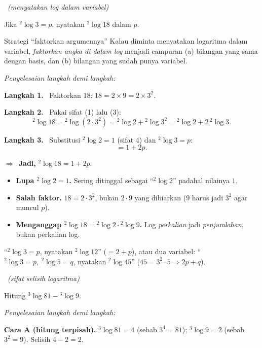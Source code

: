 \documentclass[11pt,a4paper]{report}
\theoremstyle{gaya}
\newcommand{\jawab}{\par\smallskip\noindent\textit{\textcolor{oranye}{Penyelesaian langkah demi langkah:}}\par\smallskip}
\newcommand{\langkah}[1]{\par\smallskip\noindent\textbf{\textcolor{biru}{Langkah #1.}}\ }
\newcommand{\jadi}{\par\smallskip\noindent$\Rightarrow$\ \textbf{Jadi, }}
\newcommand{\soalno}[2]{%
  \par\bigskip
  \noindent{\large\bfseries\color{ungu}\rule[-2pt]{4pt}{14pt}\ Soal #1}%
  \ {\normalfont\itshape\color{gray}(#2)}\par\nopagebreak\smallskip}
\begin{document}
\soalno{1.3.2}{menyatakan log dalam variabel}
\begin{soalbox}{}
Jika ${}^{2}\!\log 3 = p$, nyatakan ${}^{2}\!\log 18$ dalam $p$.
\end{soalbox}

\begin{ingat}{Strategi ``faktorkan argumennya''}
Kalau diminta menyatakan logaritma dalam variabel, \emph{faktorkan angka di
dalam log} menjadi campuran (a) bilangan yang sama dengan basis, dan (b) bilangan
yang sudah punya variabel.
\end{ingat}

\jawab
\langkah{1} Faktorkan $18$: $18 = 2\times 9 = 2\times 3^2$.
\langkah{2} Pakai sifat (1) lalu (3):
\[
{}^{2}\!\log 18 = {}^{2}\!\log(2\cdot3^2) = {}^{2}\!\log 2 + {}^{2}\!\log 3^2
= {}^{2}\!\log 2 + 2\,{}^{2}\!\log 3.
\]
\langkah{3} Substitusi ${}^{2}\!\log2=1$ (sifat 4) dan ${}^{2}\!\log3=p$:
\[
= 1 + 2p.
\]
\jadi ${}^{2}\!\log 18 = 1+2p$.

\begin{jebakan}
\begin{itemize}[leftmargin=*,topsep=2pt]
  \item \textbf{Lupa ${}^{2}\!\log2=1$.} Sering ditinggal sebagai
  ``${}^{2}\!\log2$'' padahal nilainya $1$.
  \item \textbf{Salah faktor.} $18=2\cdot3^2$, bukan $2\cdot9$ yang dibiarkan
  ($9$ harus jadi $3^2$ agar muncul $p$).
  \item \textbf{Menganggap ${}^{2}\!\log18={}^{2}\!\log2\cdot{}^{2}\!\log9$.}
  Log \emph{perkalian} jadi \emph{penjumlahan}, bukan perkalian log.
\end{itemize}
\end{jebakan}

\begin{variasi}
``${}^{2}\!\log3=p$, nyatakan ${}^{2}\!\log12$'' ($=2+p$), atau dua variabel:
``${}^{2}\!\log3=p,\ {}^{2}\!\log5=q$, nyatakan ${}^{2}\!\log 45$''
($45=3^2\cdot5\Rightarrow 2p+q$).
\end{variasi}

\soalno{1.3.3}{sifat selisih logaritma}
\begin{soalbox}{}
Hitung ${}^{3}\!\log 81 - {}^{3}\!\log 9$.
\end{soalbox}

\jawab
\textbf{Cara A (hitung terpisah).} ${}^{3}\!\log81=4$ (sebab $3^4=81$);
${}^{3}\!\log9=2$ (sebab $3^2=9$). Selisih $4-2=2$.
\end{document}
